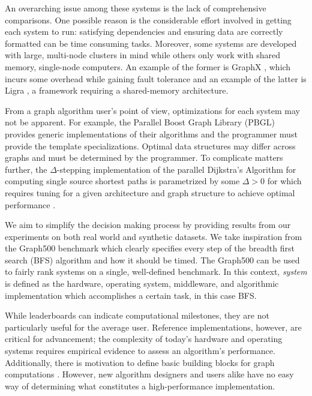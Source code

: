\documentclass[conference]{IEEEtran}
\begin{document}
An overarching issue among these systems is the lack of comprehensive comparisons. One possible reason is the considerable effort involved in getting each system to run: satisfying dependencies and ensuring data are correctly formatted can be time consuming tasks. Moreover, some systems are developed with large, multi-node clusters in mind while others only work with shared memory, single-node computers. An example of the former is GraphX \cite{Xin:2013:GraphX}, which incurs some overhead while gaining fault tolerance and an example of the latter is Ligra \cite{Shun:2013:Ligra}, a framework requiring a shared-memory architecture.

From a graph algorithm user's point of view, optimizations for each system may not be apparent. For example, the Parallel Boost Graph Library (PBGL)~\cite{Gregor:2005:PBGL} provides generic implementations of their algorithms and the programmer must provide the template specializations. Optimal data structures may differ across graphs and must be determined by the programmer. To complicate matters further, the $\Delta$-stepping implementation of the parallel Dijkstra's Algorithm for computing single source shortest paths is parametrized by some $\Delta > 0$ for which requires tuning for a given architecture and graph structure to achieve optimal performance \cite{Panitanarak:2014:SSSPPerf}. 

We aim to simplify the decision making process by providing results from our experiments on both real world and synthetic datasets. We take inspiration from the Graph500 benchmark \cite{Murphy:2010:Graph500} which clearly specifies every step of the breadth first search (BFS) algorithm and how it should be timed. The Graph500 can be used to fairly rank systems on a single, well-defined benchmark. In this context, \emph{system} is defined as the hardware, operating system, middleware, and algorithmic implementation which accomplishes a certain task, in this case BFS.

While leaderboards can indicate computational milestones, they are not particularly useful for the average user. Reference implementations, however, are critical for advancement; the complexity of today's hardware and operating systems requires empirical evidence to assess an algorithm's performance. Additionally, there is motivation to define basic building blocks for graph computations \cite{GABB16, Buluc:CombBLAS:2011}. However, new algorithm designers and users alike have no easy way of determining what constitutes a high-performance implementation.
\end{document}
